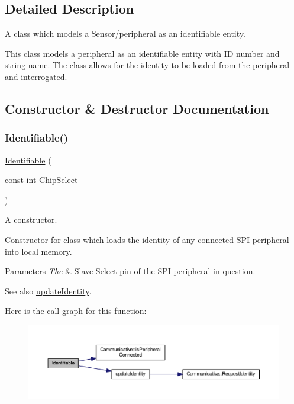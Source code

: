 \subsection{Detailed Description}
A class which models a Sensor/peripheral as an identifiable entity. 

This class models a peripheral as an identifiable entity with ID number and string name. The class allows for the identity to be loaded from the peripheral and interrogated. 

\subsection{Constructor \& Destructor Documentation}
\mbox{\label{class_identifiable_a107ce612ee60e9be98085abdfbfdc83e}} 
\subsubsection{\texorpdfstring{Identifiable()}{Identifiable()}}
{\footnotesize\ttfamily \mbox{\hyperlink{class_identifiable}{Identifiable}} (\begin{DoxyParamCaption}\item[{const int}]{Chip\+Select }\end{DoxyParamCaption})}



A constructor. 

Constructor for class which loads the identity of any connected S\+PI peripheral into local memory. 
\begin{DoxyParams}{Parameters}
{\em The} & Slave Select pin of the S\+PI peripheral in question. \\
\hline
\end{DoxyParams}
\begin{DoxySeeAlso}{See also}
\mbox{\hyperlink{class_identifiable_ae99f8914426041ea02932d0ed00b29c3}{update\+Identity}}. 
\end{DoxySeeAlso}
Here is the call graph for this function\+:
\nopagebreak
\begin{figure}[H]
\begin{center}
\leavevmode
\includegraphics[width=350pt]{class_identifiable_a107ce612ee60e9be98085abdfbfdc83e_cgraph}
\end{center}
\end{figure}


